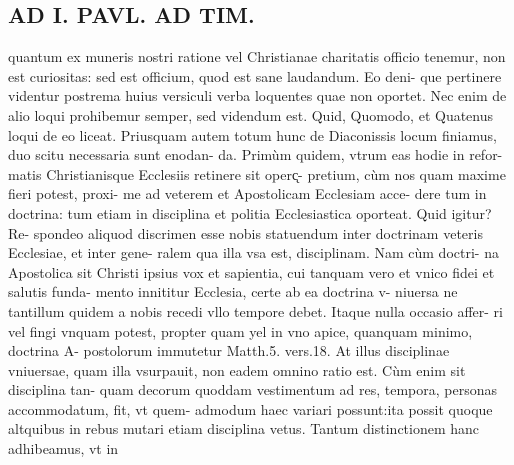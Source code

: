 \documentclass{article}
\begin{document}
\begin{pages}
\section*{AD I. PAVL. AD TIM. }
\marginpar{[ p.286 ]}\pstart quantum ex muneris nostri ratione vel Christianae charitatis officio tenemur, non est curiositas: sed est officium, quod est sane laudandum. Eo deni- que pertinere videntur postrema huius versiculi verba loquentes quae non oportet. Nec enim de alio loqui prohibemur semper, sed videndum est. Quid, Quomodo, et Quatenus loqui de eo liceat.  \pend\pstart Priusquam autem totum hunc de Diaconissis locum finiamus, duo scitu necessaria sunt enodan- da. Primùm quidem, vtrum eas hodie in refor- matis Christianisque Ecclesiis retinere sit operc̨- pretium, cùm nos quam maxime fieri potest, proxi- me ad veterem et Apostolicam Ecclesiam acce- dere tum in doctrina: tum etiam in disciplina et politia Ecclesiastica oporteat. Quid igitur? Re- spondeo aliquod discrimen esse nobis statuendum inter doctrinam veteris Ecclesiae, et inter gene- ralem qua illa vsa est, disciplinam. Nam cùm doctri- na Apostolica sit Christi ipsius vox et sapientia, cui tanquam vero et vnico fidei et salutis funda- mento innititur Ecclesia, certe ab ea doctrina v- niuersa ne tantillum quidem a nobis recedi vllo tempore debet. Itaque nulla occasio affer- ri vel fingi vnquam potest, propter quam yel in vno apice, quanquam minimo, doctrina A- postolorum immutetur Matth.5. vers.18. At illus disciplinae vniuersae, quam illa vsurpauit, non eadem omnino ratio est. Cùm enim sit disciplina tan- quam decorum quoddam vestimentum ad res, tempora, personas accommodatum, fit, vt quem- admodum haec variari possunt:ita possit quoque altquibus in rebus mutari etiam disciplina vetus. Tantum distinctionem hanc adhibeamus, vt in  \pend

\end{pages}
\end{document}
